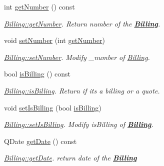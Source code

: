\begin{DoxyCompactItemize}
int \hyperlink{classModels_1_1Billing_a48c6e28a4aec13f8ed6b3ebbab837f0b}{get\+Number} () const 
\begin{DoxyCompactList}\small\item\em \hyperlink{classModels_1_1Billing_a48c6e28a4aec13f8ed6b3ebbab837f0b}{Billing\+::get\+Number}. Return number of the {\bfseries \hyperlink{classModels_1_1Billing}{Billing}}. \end{DoxyCompactList}\item 
void \hyperlink{classModels_1_1Billing_a2b43e0c657a9e717c9d2c091d222369e}{set\+Number} (int \hyperlink{classModels_1_1Billing_a48c6e28a4aec13f8ed6b3ebbab837f0b}{get\+Number})
\begin{DoxyCompactList}\small\item\em \hyperlink{classModels_1_1Billing_a2b43e0c657a9e717c9d2c091d222369e}{Billing\+::set\+Number}. Modify {\itshape \+\_\+number} of \hyperlink{classModels_1_1Billing}{Billing}. \end{DoxyCompactList}\item 
bool \hyperlink{classModels_1_1Billing_ab03dd29a9812a995355a1d93318f348f}{is\+Billing} () const 
\begin{DoxyCompactList}\small\item\em \hyperlink{classModels_1_1Billing_ab03dd29a9812a995355a1d93318f348f}{Billing\+::is\+Billing}. Return if it\textquotesingle{}s a billing or a quote. \end{DoxyCompactList}\item 
void \hyperlink{classModels_1_1Billing_aff8b71426c02bc97f0a724ef762cd42e}{set\+Is\+Billing} (bool \hyperlink{classModels_1_1Billing_ab03dd29a9812a995355a1d93318f348f}{is\+Billing})
\begin{DoxyCompactList}\small\item\em \hyperlink{classModels_1_1Billing_aff8b71426c02bc97f0a724ef762cd42e}{Billing\+::set\+Is\+Billing}. Modify {\itshape is\+Billing} of {\bfseries \hyperlink{classModels_1_1Billing}{Billing}}. \end{DoxyCompactList}\item 
Q\+Date \hyperlink{classModels_1_1Billing_af0d1f0132d0902fb96456d0a9018b701}{get\+Date} () const 
\begin{DoxyCompactList}\small\item\em \hyperlink{classModels_1_1Billing_af0d1f0132d0902fb96456d0a9018b701}{Billing\+::get\+Date}. return date of the {\bfseries \hyperlink{classModels_1_1Billing}{Billing}} \end{DoxyCompactList}\item 

\end{DoxyCompactItemize}
